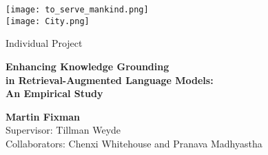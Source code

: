 \documentclass[a4paper,11pt]{article}
\begin{document}
\begin{titlepage}
	\begin{center}
		\LARGE
		\sffamily

		\texttt{[image: to\_serve\_mankind.png]} \\[1ex]
		\texttt{[image: City.png]}

		\vspace{30pt}

		Individual Project

		\vspace{15pt}

		\begin{Huge}
			\bfseries
			Enhancing Knowledge Grounding \\ in Retrieval-Augmented Language Models: \\[1em]
			An Empirical Study
		\end{Huge}

		\vfill{}

		\begin{sffamily}
			\textbf{Martin Fixman} \\[1em]
			Supervisor: Tillman Weyde \\
			Collaborators: Chenxi Whitehouse and Pranava Madhyastha
		\end{sffamily}
	\end{center}
\end{titlepage}
\restoregeometry{}

\clearpage{}
\tableofcontents{}

\clearpage{}




\clearpage{}


\clearpage{}


\clearpage{}


\clearpage{}



\clearpage{}



\clearpage{}


\clearpage{}
\begin{small}
	
\end{small}

\clearpage{}

\appendixpage{}
\appendix{}



\clearpage{}




\end{document}
